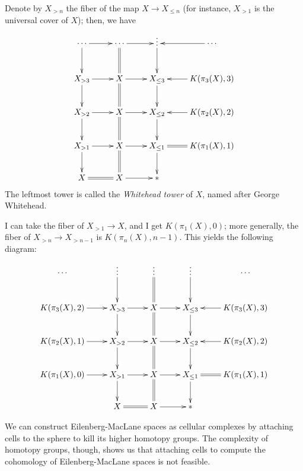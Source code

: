 Denote by $X_{>n}$ the fiber of the map $X\to X_{\leq n}$ (for instance, $X_{>1}$ is the universal cover of $X$); then, we have
\begin{equation*}
    \xymatrix{
	\cdots\ar[r]\ar[d] & \cdots\ar[r]\ar@{=}[d] & \vdots\ar[d] & \cdots\ar[l]\\
	X_{>3}\ar[r]\ar[d] & X\ar[r]\ar@{=}[d] & X_{\leq 3}\ar[d]& K(\pi_3(X),3)\ar[l]\\
	X_{>2}\ar[r]\ar[d] & X\ar[r]\ar@{=}[d] & X_{\leq 2}\ar[d]& K(\pi_2(X),2)\ar[l]\\
	X_{>1}\ar[r]\ar[d] & X\ar[r]\ar@{=}[d] & X_{\leq 1}\ar@{=}[r]\ar[d] & K(\pi_1(X),1)\\
	X\ar@{=}[r] & X\ar[r] & \ast
    }
\end{equation*}
The leftmost tower is called the \emph{Whitehead tower} of $X$, named after George Whitehead.

I can take the fiber of $X_{>1}\to X$, and I get $K(\pi_1(X),0)$;
more generally, the fiber of $X_{>n} \to X_{>n-1}$ is $K(\pi_n(X),n-1)$.
This yields the following diagram:
\begin{equation*}
    \xymatrix{
	\cdots & \vdots\ar[d] & \vdots\ar@{=}[d] & \vdots\ar[d] & \cdots\\
	K(\pi_3(X),2)\ar[r] & X_{>3}\ar[r]\ar[d] & X\ar[r]\ar@{=}[d] & X_{\leq 3}\ar[d]& K(\pi_3(X),3)\ar[l]\\
	K(\pi_2(X),1)\ar[r] & X_{>2}\ar[r]\ar[d] & X\ar[r]\ar@{=}[d] & X_{\leq 2}\ar[d]& K(\pi_2(X),2)\ar[l]\\
	K(\pi_1(X),0)\ar[r] & X_{>1}\ar[r]\ar[d] & X\ar[r]\ar@{=}[d] & X_{\leq 1}\ar@{=}[r]\ar[d] & K(\pi_1(X),1)\\
	& X\ar@{=}[r] & X\ar[r] & \ast
    }
\end{equation*}

We can construct Eilenberg-MacLane spaces as cellular complexes by attaching cells to the sphere to kill its higher homotopy groups.
The complexity of homotopy groups, though, shows us that attaching cells to compute the cohomology of Eilenberg-MacLane spaces
is not feasible.

